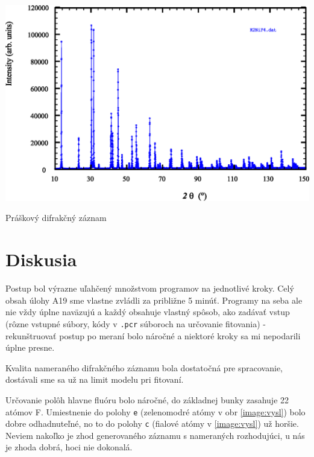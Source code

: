 \documentclass[a4paper, 10pt]{article}
\begin{document}
\begin{graph}[tb]
\centering
\includegraphics[scale=0.70]{data/spektrum.eps}
\caption{ Práškový difrakčný záznam \label{graph:spektrum}}
\end{graph}

\section*{Diskusia}
Postup bol výrazne uľahčený množstvom programov na jednotlivé kroky. Celý obsah úlohy A19 sme vlastne zvládli za približne 5 minúť. Programy na seba ale nie vždy úplne naväzujú a každý obsahuje vlastný spôsob, ako zadávať vstup (rôzne vstupné súbory, kódy v \texttt{.pcr} súboroch na určovanie fitovania) - rekunštruovať postup po meraní bolo náročné a niektoré kroky sa mi nepodarili úplne presne.

Kvalita nameraného difrakčného záznamu bola dostatočná pre spracovanie, dostávali sme sa už na limit modelu pri fitovaní.

Určovanie polôh hlavne fluóru bolo náročné, do základnej bunky zasahuje 22 atómov F. Umiestnenie do polohy \texttt{e} (zelenomodré atómy v obr \ref{image:vysl}) bolo dobre odhadnuteľné, no to do polohy \texttt{c} (fialové atómy v \ref{image:vysl}) už horšie. Neviem nakoľko je zhod generovaného záznamu s nameraných rozhodujúci, u nás je zhoda dobrá, hoci nie dokonalá.
\end{document}
